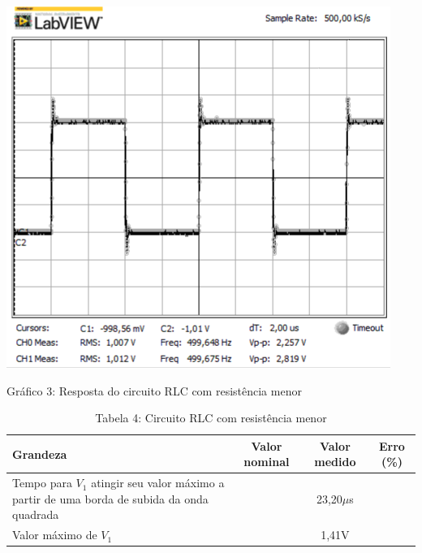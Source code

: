 \documentclass[a4 paper]{article}
\begin{document}
\begin{table}[h]
\centering
\includegraphics[scale=0.6]{rgadicoas/rgadicoa3}
\end{table}

\begin{center}
Gráfico 3: Resposta do circuito RLC com resistência menor
\end{center}


\vspace{5pt}
\begin{table}[hb]
\centering
\begin{tabular}{|p{5cm}|c|c|c|}
\hline
Grandeza & Valor nominal & Valor medido & Erro (\%) \\\hline
Tempo para $V_1$ atingir seu valor máximo a partir de uma borda de subida da onda quadrada &  & 23,20$\mu$s & \\    \hline
\centering Valor máximo de $V_1$ &  & 1,41V & \\    \hline
\end{tabular}
\caption*{Tabela 4: Circuito RLC com resistência menor}
\end{table}
\end{document}
